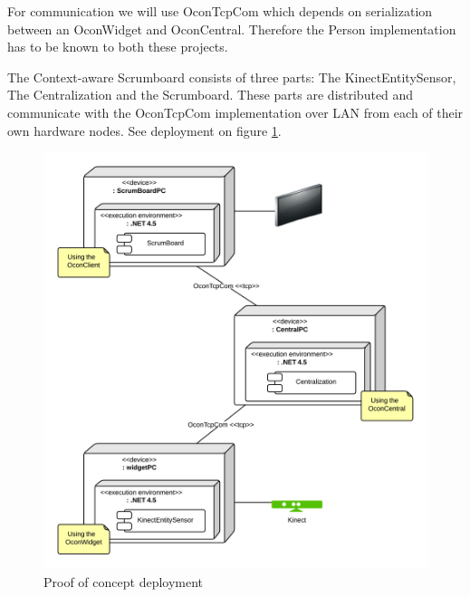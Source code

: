 \documentclass[../report.tex]{subfiles}
\begin{document}
For communication we will use OconTcpCom which depends on serialization between an OconWidget and OconCentral. Therefore the Person implementation has to be known to both these projects.



The Context-aware Scrumboard consists of three parts: The KinectEntitySensor, The Centralization and the Scrumboard. These parts are distributed and communicate with the OconTcpCom implementation over LAN from each of their own hardware nodes. See deployment on figure \ref{fig:ProofofConceptDeployment}.


\begin{figure}[H]
\begin{center}
\includegraphics[scale=0.155]{./ProofOfConceptDeployment.png}
\caption{Proof of concept deployment}
\end{center}
\label{fig:ProofofConceptDeployment}
\end{figure}
\end{document}
